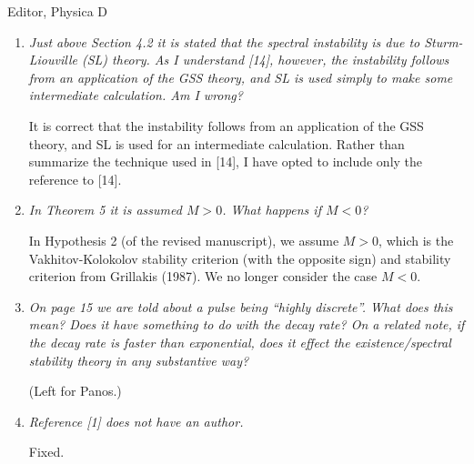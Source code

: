 \documentclass[11pt]{letter}
\begin{document}
\begin{letter}{Editor, Physica D}
\begin{enumerate}
\vspace{4mm}
Standard implmentations of Lin's method, e.g. Knobloch (2000) for the discrete case, require that the problem be posed as a first order difference equation. For systems where this is difficult to do, e.g. the coupling between nodes is nonlinear, a different approach would be needed. I added a comment to this effect in section 3.2.
\vspace{4mm}

\item \emph{Just above Section 4.2 it is stated that the spectral instability is due to Sturm-Liouville (SL) theory. As I understand [14], however, the instability follows from an application of the GSS theory, and SL is used simply to make some intermediate calculation. Am I wrong?}

\vspace{4mm}
It is correct that the instability follows from an application of the GSS theory, and SL is used for an intermediate calculation. Rather than summarize the technique used in [14], I have opted to include only the reference to [14].
\vspace{4mm}

\item \emph{In Theorem 5 it is assumed $M > 0$. What happens if $M < 0$?}

\vspace{4mm}
In Hypothesis 2 (of the revised manuscript), we assume $M > 0$, which is the Vakhitov-Kolokolov stability criterion (with the opposite sign) and stability criterion from Grillakis (1987). We no longer consider the case $M < 0$.
\vspace{4mm}

\item \emph{On page 15 we are told about a pulse being ``highly discrete''. What does this mean? Does it have something to do with the decay rate? On a related note, if the decay rate is faster than exponential, does it effect the existence/spectral stability theory in any substantive way?}

\vspace{4mm}
(Left for Panos.)
\vspace{4mm}

\item \emph{Reference [1] does not have an author.}

\vspace{4mm}
Fixed.
\vspace{4mm}

\end{enumerate}


\end{letter}
\end{document}
